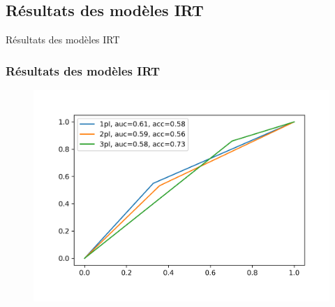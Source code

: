 \documentclass[aspectratio=169,professionalfonts, 12pt]{beamer}
\begin{document}
\subsection{Résultats des modèles IRT}

\begin{frame}
  \justifying 
  \begin{minipage}{\textwidth}
    \begin{center}
      \huge Résultats des modèles IRT
    \end{center}
  \end{minipage}
\end{frame}


\begin{frame}
  \frametitle{Résultats des modèles IRT}
  \justifying 
  \begin{minipage}{\textwidth}
    \begin{figure}[H]
      \begin{center}
        \includegraphics[scale=0.6]{images/contribution/roc_auc.png}
      \end{center}
    \end{figure}
  \end{minipage}
\end{frame}
\end{document}

